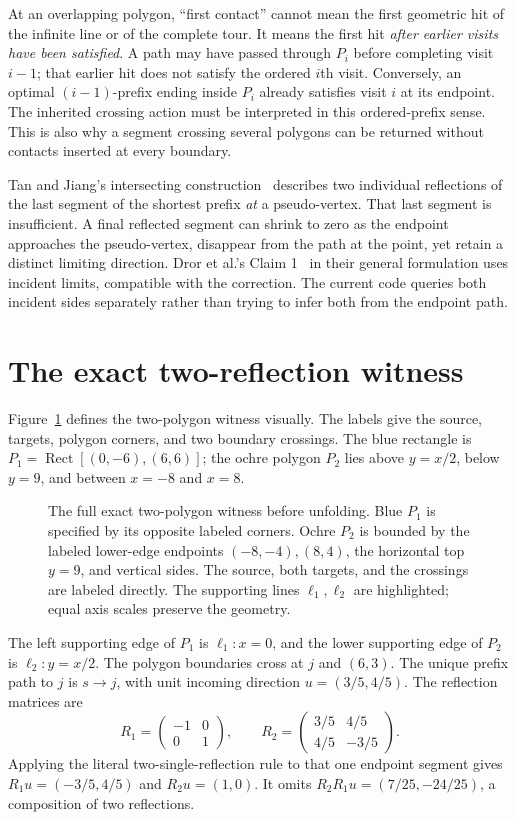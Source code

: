 \documentclass[12pt,a4paper]{article}
\newcommand{\Rect}[2]{\operatorname{Rect}\!\left[#1,#2\right]}
\begin{document}
At an overlapping polygon, ``first contact'' cannot mean the first geometric hit of the infinite line or of the complete tour. It means the first hit \emph{after earlier visits have been satisfied}. A path may have passed through \(P_i\) before completing visit \(i-1\); that earlier hit does not satisfy the ordered \(i\)th visit. Conversely, an optimal \((i-1)\)-prefix ending inside \(P_i\) already satisfies visit \(i\) at its endpoint. The inherited crossing action must be interpreted in this ordered-prefix sense. This is also why a segment crossing several polygons can be returned without contacts inserted at every boundary.

Tan and Jiang's intersecting construction~\cite[Section~4, printed p.~621]{tanjiang17} describes two individual reflections of the last segment of the shortest prefix \emph{at} a pseudo-vertex. That last segment is insufficient. A final reflected segment can shrink to zero as the endpoint approaches the pseudo-vertex, disappear from the path at the point, yet retain a distinct limiting direction. Dror et al.'s Claim 1~\cite[Section~4.1, printed p.~477]{dror03} in their general formulation uses incident limits, compatible with the correction. The current code queries both incident sides separately rather than trying to infer both from the endpoint path.

\section{The exact two-reflection witness}
Figure~\ref{fig:witness-setup} defines the two-polygon witness visually. The labels give the source, targets, polygon corners, and two boundary crossings. The blue rectangle is \(P_1=\Rect{(0,-6)}{(6,6)}\); the ochre polygon \(P_2\) lies above \(y=x/2\), below \(y=9\), and between \(x=-8\) and \(x=8\).
\begin{figure}[H]\centering\figwitnesssetup\caption{The full exact two-polygon witness before unfolding. Blue \(P_1\) is specified by its opposite labeled corners. Ochre \(P_2\) is bounded by the labeled lower-edge endpoints \((-8,-4),(8,4)\), the horizontal top \(y=9\), and vertical sides. The source, both targets, and the crossings are labeled directly. The supporting lines \(\ell_1,\ell_2\) are highlighted; equal axis scales preserve the geometry.}\label{fig:witness-setup}\end{figure}
The left supporting edge of \(P_1\) is \(\ell_1:x=0\), and the lower supporting edge of \(P_2\) is \(\ell_2:y=x/2\). The polygon boundaries cross at \(j\) and \((6,3)\). The unique prefix path to \(j\) is \(s\to j\), with unit incoming direction \(u=(3/5,4/5)\). The reflection matrices are
\[
R_1=\begin{pmatrix}-1&0\\0&1\end{pmatrix},\qquad
R_2=\begin{pmatrix}3/5&4/5\\4/5&-3/5\end{pmatrix}.
\]
Applying the literal two-single-reflection rule to that one endpoint segment gives \(R_1u=(-3/5,4/5)\) and \(R_2u=(1,0)\). It omits \(R_2R_1u=(7/25,-24/25)\), a composition of two reflections.
\end{document}
